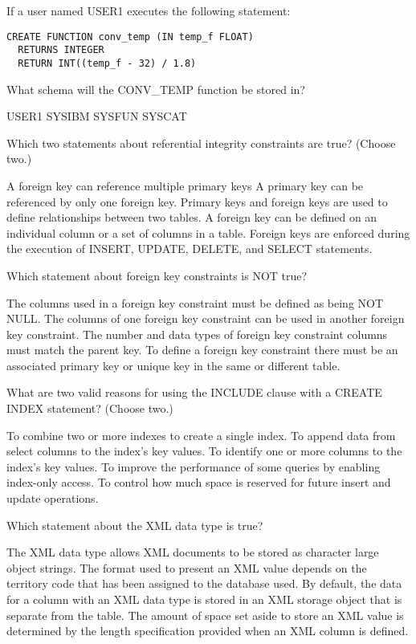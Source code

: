 \documentclass[11pt]{exam}
\begin{document}
\begin{questions}
\question[1]
If a user named USER1 executes the following statement:
\begin{verbatim}
CREATE FUNCTION conv_temp (IN temp_f FLOAT)
  RETURNS INTEGER
  RETURN INT((temp_f - 32) / 1.8)
\end{verbatim}
What schema will the CONV_TEMP function be stored in?
\begin{choices}
\choice USER1
\choice SYSIBM
\choice SYSFUN
\choice SYSCAT
\end{choices}

\question[1]
Which two statements about referential integrity constraints are true? (Choose two.)
\begin{choices}
\choice A foreign key can reference multiple primary keys
\choice A primary key can be referenced by only one foreign key.
\choice Primary keys and foreign keys are used to define relationships between two tables. 
\choice A foreign key can be defined on an individual column or a set of columns in a table.
\choice Foreign keys are enforced during the execution of INSERT, UPDATE, DELETE, and SELECT statements.
\end{choices}

\question[1]
Which statement about foreign key constraints is NOT true?
\begin{choices}
\choice The columns used in a foreign key constraint must be defined as being NOT NULL.
\choice The columns of one foreign key constraint can be used in another foreign key constraint.
\choice The number and data types of foreign key constraint columns must match the parent key.
\choice To define a foreign key constraint there must be an associated primary key or unique key in the same or different
table.
\end{choices}

\question[1]
What are two valid reasons for using the INCLUDE clause with a CREATE INDEX statement? (Choose two.)
\begin{choices}
\choice To combine two or more indexes to create a single index.
\choice To append data from select columns to the index's key values.
\choice To identify one or more columns to the index's key values.
\choice To improve the performance of some queries by enabling index-only access.
\choice To control how much space is reserved for future insert and update operations.
\end{choices}

\question[1]
Which statement about the XML data type is true?
\begin{choices}
\choice The XML data type allows XML documents to be stored as character large object strings.
\choice The format used to present an XML value depends on the territory code that has been assigned to the database used.
\choice By default, the data for a column with an XML data type is stored in an XML storage object that is separate from
the table.
\choice The amount of space set aside to store an XML value is determined by the length specification provided when an
XML column is defined.
\end{choices}
\question[1]


\end{questions}
\end{document}
